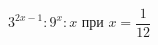 \begin{ex}
	\begin{condition}
		\( 3^{2x-1}:9^x:x \) при \( x=\dfrac{1}{12} \)
	\end{condition}
\end{ex}